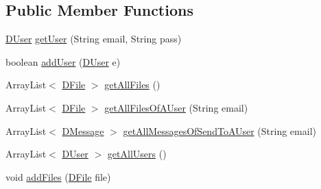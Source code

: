\subsection*{Public Member Functions}
\begin{DoxyCompactItemize}
\item 
\mbox{\hyperlink{classes_1_1deusto_1_1bspq18_1_1e6_1_1_deusto_box_1_1_server_1_1jdo_1_1data_1_1_d_user}{D\+User}} \mbox{\hyperlink{interfacees_1_1deusto_1_1bspq18_1_1e6_1_1_deusto_box_1_1_server_1_1jdo_1_1dao_1_1_i_deusto_box_d_a_o_a3060dee0eb077bd108326b4b47c57aba}{get\+User}} (String email, String pass)
\item 
boolean \mbox{\hyperlink{interfacees_1_1deusto_1_1bspq18_1_1e6_1_1_deusto_box_1_1_server_1_1jdo_1_1dao_1_1_i_deusto_box_d_a_o_af07ddb0e279fe175190eb091618dfc06}{add\+User}} (\mbox{\hyperlink{classes_1_1deusto_1_1bspq18_1_1e6_1_1_deusto_box_1_1_server_1_1jdo_1_1data_1_1_d_user}{D\+User}} e)
\item 
Array\+List$<$ \mbox{\hyperlink{classes_1_1deusto_1_1bspq18_1_1e6_1_1_deusto_box_1_1_server_1_1jdo_1_1data_1_1_d_file}{D\+File}} $>$ \mbox{\hyperlink{interfacees_1_1deusto_1_1bspq18_1_1e6_1_1_deusto_box_1_1_server_1_1jdo_1_1dao_1_1_i_deusto_box_d_a_o_a1b64a2f73f852c4bc0cf63f97c71914f}{get\+All\+Files}} ()
\item 
Array\+List$<$ \mbox{\hyperlink{classes_1_1deusto_1_1bspq18_1_1e6_1_1_deusto_box_1_1_server_1_1jdo_1_1data_1_1_d_file}{D\+File}} $>$ \mbox{\hyperlink{interfacees_1_1deusto_1_1bspq18_1_1e6_1_1_deusto_box_1_1_server_1_1jdo_1_1dao_1_1_i_deusto_box_d_a_o_ab3150a29bdcc6f5b24694f81ef3c6858}{get\+All\+Files\+Of\+A\+User}} (String email)
\item 
Array\+List$<$ \mbox{\hyperlink{classes_1_1deusto_1_1bspq18_1_1e6_1_1_deusto_box_1_1_server_1_1jdo_1_1data_1_1_d_message}{D\+Message}} $>$ \mbox{\hyperlink{interfacees_1_1deusto_1_1bspq18_1_1e6_1_1_deusto_box_1_1_server_1_1jdo_1_1dao_1_1_i_deusto_box_d_a_o_a094a7ffc9b83044c593b5f2c3d5e3068}{get\+All\+Messages\+Of\+Send\+To\+A\+User}} (String email)
\item 
Array\+List$<$ \mbox{\hyperlink{classes_1_1deusto_1_1bspq18_1_1e6_1_1_deusto_box_1_1_server_1_1jdo_1_1data_1_1_d_user}{D\+User}} $>$ \mbox{\hyperlink{interfacees_1_1deusto_1_1bspq18_1_1e6_1_1_deusto_box_1_1_server_1_1jdo_1_1dao_1_1_i_deusto_box_d_a_o_ae04e180df7666d21b8c09129c2f5e757}{get\+All\+Users}} ()
\item 
void \mbox{\hyperlink{interfacees_1_1deusto_1_1bspq18_1_1e6_1_1_deusto_box_1_1_server_1_1jdo_1_1dao_1_1_i_deusto_box_d_a_o_a270bfbab2597b371cd62ded78f231bf3}{add\+Files}} (\mbox{\hyperlink{classes_1_1deusto_1_1bspq18_1_1e6_1_1_deusto_box_1_1_server_1_1jdo_1_1data_1_1_d_file}{D\+File}} file)

\end{DoxyCompactItemize}
